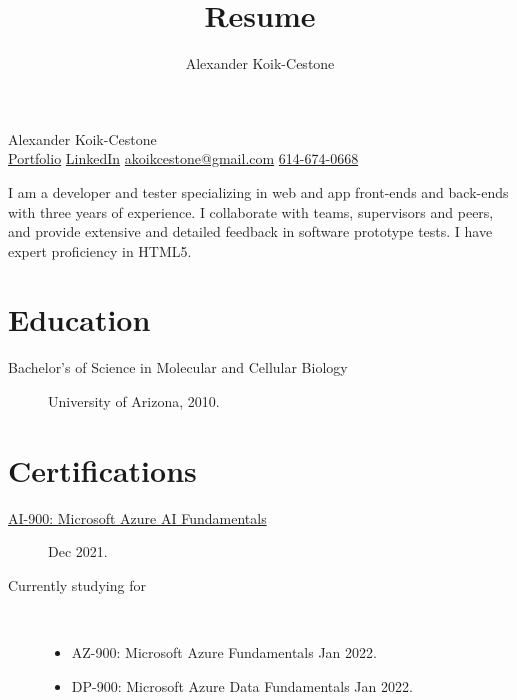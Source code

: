 \documentclass{article}
\author{Alexander Koik-Cestone}
\title{Resume}
\begin{document}
\begin{center}
{\huge Alexander Koik-Cestone\vspace{0.3cm}} \\
\href{https://sirkoik.github.io#portfolio}{Portfolio}
\textcolor{gray}{\textbullet}
\href{https://www.linkedin.com/in/alexander-koik-cestone-89304556/}{LinkedIn}
\textcolor{gray}{\textbullet}
\href{mailto:akoikcestone@gmail.com}{akoikcestone@gmail.com}
\textcolor{gray}{\textbullet}
\href{tel:614-674-0668}{614-674-0668} \\
\end{center}

\noindent
I am a developer and tester specializing in web and app front-ends and back-ends with three years of experience. I collaborate with teams, supervisors and peers, and provide extensive and detailed feedback in software prototype tests. I have expert proficiency in HTML5.

\section*{Education}\vspace{-0.5em}
\begin{description}
  \item[Bachelor's of Science in Molecular and Cellular Biology] University of Arizona, 2010.
\end{description}

\vspace{-1em}
\section*{Certifications}\vspace{-0.5em}
\begin{description}
  \item [\href{https://www.credly.com/badges/fa66cf6b-dff5-4f58-9f4e-4b94fc91b7fa/public_url}{AI-900: Microsoft Azure AI Fundamentals}] Dec 2021.
\end{description}

\begin{description}
  \item [Currently studying for] ~
  \begin{itemize}
    \item AZ-900: Microsoft Azure Fundamentals Jan 2022.
    \item DP-900: Microsoft Azure Data Fundamentals Jan 2022.
  \end{itemize} 
\end{description}
\end{document}
